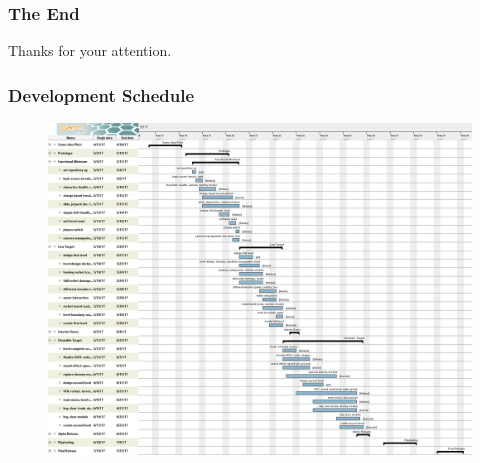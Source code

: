 \documentclass[xcolor=dvipsnames]{beamer}
\begin{document}
	\begin{frame}
		\frametitle{The End}
		\centering
		\Huge
		Thanks for your attention.
	\end{frame}
	
	\begin{frame}
		\frametitle{Development Schedule}
		\begin{figure}
			\centering
			\includegraphics[scale=0.225]{images/GamesLab2017SS_ShortNew}
		\end{figure}
	\end{frame}
\end{document}
